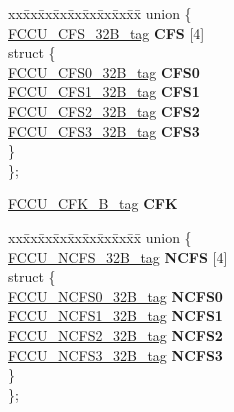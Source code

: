 \begin{DoxyCompactItemize}
\begin{tabbing}
\end{tabbing}\item 
\mbox{\label{structFCCU__struct__tag_a45bc63655632834bf2cc8c887d460418}} 
\begin{tabbing}
xx\=xx\=xx\=xx\=xx\=xx\=xx\=xx\=xx\=\kill
union \{\\
\>\mbox{\hyperlink{unionFCCU__CFS__32B__tag}{FCCU\_CFS\_32B\_tag}} {\bfseries CFS} \mbox{[}4\mbox{]}\\
\mbox{\label{unionFCCU__struct__tag_1_1_0D2094_a4270e3e3828b33b753d9b5a2ea2e2a45}} 
\>struct \{\\
\>\>\mbox{\hyperlink{unionFCCU__CFS0__32B__tag}{FCCU\_CFS0\_32B\_tag}} {\bfseries CFS0}\\
\>\>\mbox{\hyperlink{unionFCCU__CFS1__32B__tag}{FCCU\_CFS1\_32B\_tag}} {\bfseries CFS1}\\
\>\>\mbox{\hyperlink{unionFCCU__CFS2__32B__tag}{FCCU\_CFS2\_32B\_tag}} {\bfseries CFS2}\\
\>\>\mbox{\hyperlink{unionFCCU__CFS3__32B__tag}{FCCU\_CFS3\_32B\_tag}} {\bfseries CFS3}\\
\>\} \\
\}; \\

\end{tabbing}\item 
\mbox{\label{structFCCU__struct__tag_a8fdb67e7c57aaa0242aad84a2ebe46d6}} 
\mbox{\hyperlink{unionFCCU__CFK__32B__tag}{F\+C\+C\+U\+\_\+\+C\+F\+K\+\_\+B\+\_\+tag}} {\bfseries C\+FK}
\item 
\mbox{\label{structFCCU__struct__tag_ae6c7e19aebbf7a31eea4e4c4f22dcced}} 
\begin{tabbing}
xx\=xx\=xx\=xx\=xx\=xx\=xx\=xx\=xx\=\kill
union \{\\
\>\mbox{\hyperlink{unionFCCU__NCFS__32B__tag}{FCCU\_NCFS\_32B\_tag}} {\bfseries NCFS} \mbox{[}4\mbox{]}\\
\mbox{\label{unionFCCU__struct__tag_1_1_0D2096_aa4ed5d183ddf094cd126293acb3cdb55}} 
\>struct \{\\
\>\>\mbox{\hyperlink{unionFCCU__NCFS0__32B__tag}{FCCU\_NCFS0\_32B\_tag}} {\bfseries NCFS0}\\
\>\>\mbox{\hyperlink{unionFCCU__NCFS1__32B__tag}{FCCU\_NCFS1\_32B\_tag}} {\bfseries NCFS1}\\
\>\>\mbox{\hyperlink{unionFCCU__NCFS2__32B__tag}{FCCU\_NCFS2\_32B\_tag}} {\bfseries NCFS2}\\
\>\>\mbox{\hyperlink{unionFCCU__NCFS3__32B__tag}{FCCU\_NCFS3\_32B\_tag}} {\bfseries NCFS3}\\
\>\} \\
\}; \\


\end{tabbing}
\end{DoxyCompactItemize}
